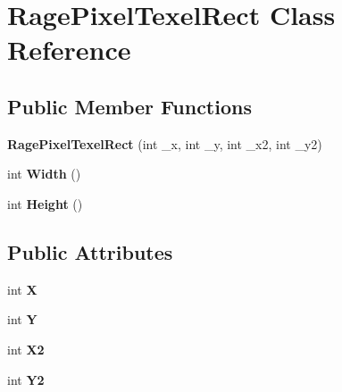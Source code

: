 \hypertarget{class_rage_pixel_texel_rect}{\section{Rage\-Pixel\-Texel\-Rect Class Reference}
\label{class_rage_pixel_texel_rect}
}
\subsection*{Public Member Functions}
\begin{DoxyCompactItemize}
\item 
\hypertarget{class_rage_pixel_texel_rect_a15964564d0a89598087a18e5fa2aaf51}{{\bfseries Rage\-Pixel\-Texel\-Rect} (int \-\_\-x, int \-\_\-y, int \-\_\-x2, int \-\_\-y2)}\label{class_rage_pixel_texel_rect_a15964564d0a89598087a18e5fa2aaf51}

\item 
\hypertarget{class_rage_pixel_texel_rect_ad50615c3ca864e47783a41156a805320}{int {\bfseries Width} ()}\label{class_rage_pixel_texel_rect_ad50615c3ca864e47783a41156a805320}

\item 
\hypertarget{class_rage_pixel_texel_rect_aa1367034c16ee326957b6ba6a16f169b}{int {\bfseries Height} ()}\label{class_rage_pixel_texel_rect_aa1367034c16ee326957b6ba6a16f169b}

\end{DoxyCompactItemize}
\subsection*{Public Attributes}
\begin{DoxyCompactItemize}
\item 
\hypertarget{class_rage_pixel_texel_rect_ad061a84b88d709b1bcd0ef0763704694}{int {\bfseries X}}\label{class_rage_pixel_texel_rect_ad061a84b88d709b1bcd0ef0763704694}

\item 
\hypertarget{class_rage_pixel_texel_rect_ac321c134d558ebc17ad162d290d73136}{int {\bfseries Y}}\label{class_rage_pixel_texel_rect_ac321c134d558ebc17ad162d290d73136}

\item 
\hypertarget{class_rage_pixel_texel_rect_a12c4ee18b07fd45991a27ece7e0bb281}{int {\bfseries X2}}\label{class_rage_pixel_texel_rect_a12c4ee18b07fd45991a27ece7e0bb281}

\item 
\hypertarget{class_rage_pixel_texel_rect_a62290bff83b7ecfcf9eb7c63b2fc32fc}{int {\bfseries Y2}}\label{class_rage_pixel_texel_rect_a62290bff83b7ecfcf9eb7c63b2fc32fc}

\end{DoxyCompactItemize}


